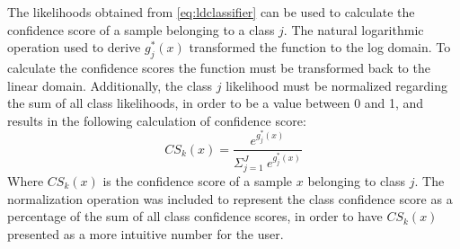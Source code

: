 \noindent The likelihoods obtained from \eqref{eq:ldclassifier} can be used to calculate the confidence score of a sample belonging to a class $j$. The natural logarithmic operation used to derive $g_{j}^{*}(x)$ transformed the function to the log domain. To calculate the confidence scores the function must be transformed back to the linear domain. Additionally, the class $j$ likelihood must be normalized regarding the sum of all class likelihoods, in order to be a value between 0 and 1, and results in the following calculation of confidence score:
\vspace{-0.02cm}
\begin{equation}
	CS_{k}(x) = \frac{e^{g^{*}_{j}(x)}}{\Sigma^{J}_{j=1}~e^{g^{*}_{j}(x)}}
\end{equation}
\vspace{-0.05cm}
\noindent Where $CS_{k}(x)$ is the confidence score of a sample $x$ belonging to class $j$. The normalization operation was included to represent the class confidence score as a percentage of the sum of all class confidence scores, in order to have $CS_{k}(x)$ presented as a more intuitive number for the user.

